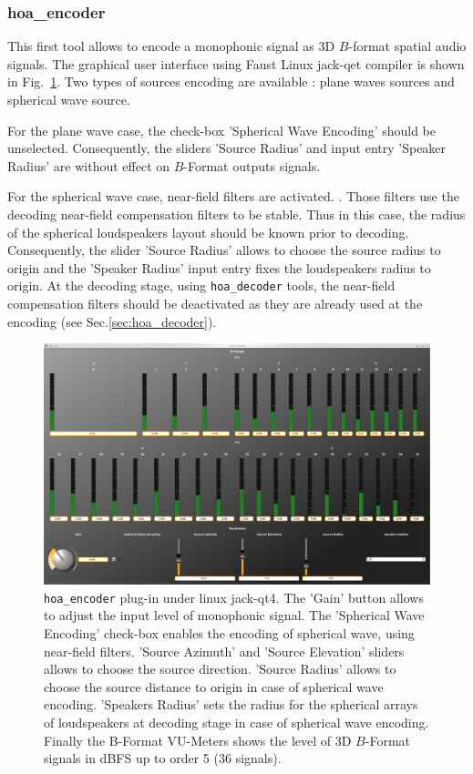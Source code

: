 \documentclass[10pt,a4paper]{article}
\begin{document}
\pagebreak
\subsubsection{hoa\_encoder}
\label{sec:hoa_encoder}
This first tool allows to encode a monophonic signal as 3D $B$-format spatial audio signals. The graphical user interface using Faust Linux jack-qet compiler is shown in Fig.~\ref{fig:hoa_encoder}. Two types of sources encoding are available : plane waves sources and spherical wave source. 

For the plane wave case, the check-box 'Spherical Wave Encoding' should be unselected. Consequently, the sliders 'Source Radius' and input entry 'Speaker Radius' are without effect on $B$-Format outputs signals.

For the spherical wave case, near-field filters are activated. \cite{daniel2003spatial,lecomte2015real}. Those filters use the decoding near-field compensation filters to be stable. Thus in this case, the radius of the spherical loudspeakers layout should be known prior to decoding. Consequently, the slider 'Source Radius' allows to choose the source radius to origin and the 'Speaker Radius' input entry fixes the loudspeakers radius to origin. At the decoding stage, using \lstinline'hoa_decoder' tools, the near-field compensation filters should be deactivated as they are already used at the encoding (see Sec.\ref{sec:hoa_decoder}).

\begin{figure}[!ht]
\includegraphics[width=\columnwidth]{hoa_encoder.png}
\caption{\lstinline'hoa_encoder' plug-in under linux jack-qt4. The 'Gain' button allows to adjust the input level of monophonic signal. The 'Spherical Wave Encoding' check-box enables the encoding of spherical wave, using near-field filters. 'Source Azimuth' and 'Source Elevation' sliders allows to choose the source direction. 'Source Radius' allows to choose the source distance to origin in case of spherical wave encoding. 'Speakers Radius' sets the radius for the spherical arrays of loudspeakers at decoding stage in case of spherical wave encoding. Finally the B-Format VU-Meters shows the level of 3D $B$-Format signals in dBFS up to order 5 (36 signals).}
\label{fig:hoa_encoder}
\end{figure}
\end{document}
